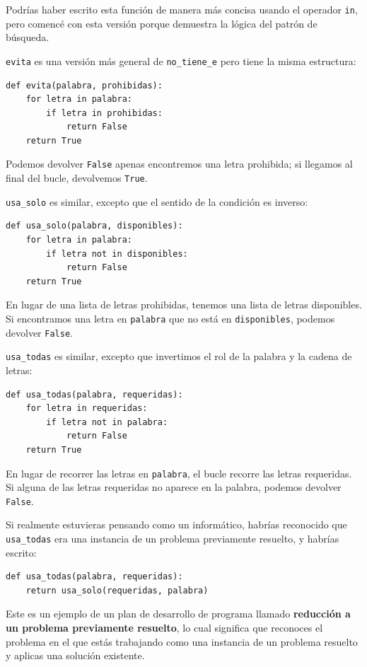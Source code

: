 \documentclass[10pt]{book}
\begin{document}
Podrías haber escrito esta función de manera más concisa usando el operador {\tt in},
pero comencé con esta versión porque
demuestra la lógica del patrón de búsqueda.

{\tt evita} es una versión más general de \verb"no_tiene_e" pero
tiene la misma estructura:

\begin{verbatim}
def evita(palabra, prohibidas):
    for letra in palabra:
        if letra in prohibidas:
            return False
    return True
\end{verbatim}
%
Podemos devolver {\tt False} apenas encontremos una letra prohibida;
si llegamos al final del bucle, devolvemos {\tt True}.

\verb"usa_solo" es similar, excepto que el sentido de la condición
es inverso:

\begin{verbatim}
def usa_solo(palabra, disponibles):
    for letra in palabra:
        if letra not in disponibles:
            return False
    return True
\end{verbatim}
%
En lugar de una lista de letras prohibidas, tenemos una lista de letras
disponibles.  Si encontramos una letra en {\tt palabra} que no está en
{\tt disponibles}, podemos devolver {\tt False}.

\verb"usa_todas" es similar, excepto que invertimos el rol
de la palabra y la cadena de letras:

\begin{verbatim}
def usa_todas(palabra, requeridas):
    for letra in requeridas:
        if letra not in palabra:
            return False
    return True
\end{verbatim}
%
En lugar de recorrer las letras en {\tt palabra}, el bucle
recorre las letras requeridas.  Si alguna de las letras requeridas
no aparece en la palabra, podemos devolver {\tt False}.

Si realmente estuvieras pensando como un informático,
habrías reconocido que \verb"usa_todas" era una instancia de un
problema previamente resuelto, y habrías escrito:

\begin{verbatim}
def usa_todas(palabra, requeridas):
    return usa_solo(requeridas, palabra)
\end{verbatim}
%
Este es un ejemplo de un plan de desarrollo de programa llamado {\bf
  reducción a un problema previamente resuelto}, lo cual significa que
reconoces el problema en el que estás trabajando como una instancia de un
problema resuelto y aplicas una solución existente.   
\end{document}
